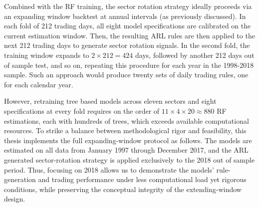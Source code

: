 Combined with the RF training, the sector rotation strategy ideally proceeds via an expanding window backtest at annual intervals (as previously discussed). In each fold of 212 trading days, all eight model specifications are calibrated on the current estimation window. Then, the resulting ARL rules are then applied to the next 212 trading days to generate sector rotation signals. In the second fold, the training window expands to $2\times212=424$ days, followed by another 212 days out of sample test, and so on, repeating this procedure for each year in the 1998-2018 sample. Such an approach would produce twenty sets of daily trading rules, one for each calendar year.

However, retraining tree based models across eleven sectors and eight specifications at every fold requires on the order of $11\times4\times20\approx880$ RF estimations, each with hundreds of trees, which exceeds available computational resources. To strike a balance between methodological rigor and feasibility, this thesis implements the full expanding-window protocol as follows. The models are estimated on all data from January 1997 through December 2017, and the ARL generated sector-rotation strategy is applied exclusively to the 2018 out of sample period. Thus, focusing on 2018 allows us to demonstrate the models' rule-generation and trading performance under less computational load yet rigorous conditions, while preserving the conceptual integrity of the extending-window design.








